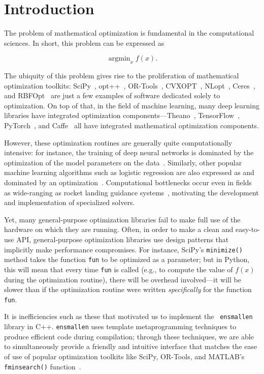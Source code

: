 \section{Introduction}
\label{sec:introduction}

The problem of mathematical optimization is fundamental in the computational
sciences.  In short, this problem can be expressed as

\begin{equation}
\operatorname{argmin}_x f(x).
\end{equation}

The ubiquity of this problem gives rise to the proliferation of mathematical
optimization toolkits: SciPy~\cite{TODO}, opt++~\cite{TODO},
OR-Tools~\cite{TODO}, CVXOPT~\cite{TODO}, NLopt~\cite{TODO}, Ceres~\cite{ceres},
and RBFOpt~\cite{TODO} are just a few examples of software dedicated solely to
optimization.  On top of that, in the field of machine learning, many deep
learning libraries have integrated optimization components---Theano~\cite{TODO},
TensorFlow~\cite{TODO}, PyTorch~\cite{TODO}, and Caffe~\cite{TODO} all have
integrated mathematical optimization components.

However, these optimization routines are generally quite computationally
intensive: for instance, the training of deep neural networks is dominated by
the optimization of the model parameters on the data~\cite{TODO}.  Similarly,
other popular machine learning algorithms such as logistic regression are also
expressed as and dominated by an optimization~\cite{TODO}.
Computational bottlenecks occur even in fields as wide-ranging as rocket landing
guidance systems~\cite{TODO}, motivating the development and implementation of
specialized solvers.

Yet, many general-purpose optimization libraries fail to make full use of the
hardware on which they are running.  Often, in order to make a clean and
easy-to-use API, general-purpose optimization libraries use design patterns that
implicitly make performance compromises.  For instance, SciPy's {\tt minimize()}
method takes the function {\tt fun} to be optimized as a parameter; but in
Python, this will mean that every time {\tt fun} is called (e.g., to compute the
value of $f(x)$ during the optimization routine), there will be overhead
involved---it will be slower than if the optimization routine were written {\it
specifically} for the function {\tt fun}.

It is inefficiencies such as these that motivated us to implement the {\tt
ensmallen} library in C++.  {\tt ensmallen} uses template metaprogramming
techniques to produce efficient code during compilation; through these
techniques, we are able to simultaneously provide a friendly and intuitive
interface that matches the ease of use of popular optimization toolkits like
SciPy, OR-Tools, and MATLAB's {\tt fminsearch()} function~\cite{TODO}.

